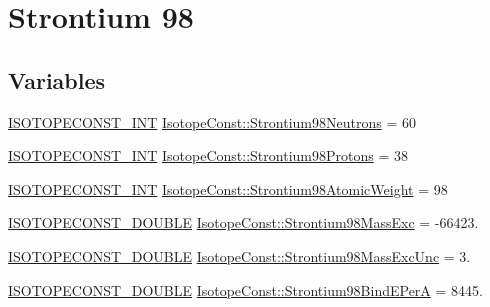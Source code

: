 \hypertarget{group___isotope_const-_strontium-_sr98}{}\section{Strontium 98}
\label{group___isotope_const-_strontium-_sr98}
\subsection*{Variables}
\begin{DoxyCompactItemize}
\item 
\mbox{\hyperlink{group___isotope_const-_macros_ga5f18360b3e99483a35c32d789e62621c}{I\+S\+O\+T\+O\+P\+E\+C\+O\+N\+S\+T\+\_\+\+I\+NT}} \mbox{\hyperlink{group___isotope_const-_strontium-_sr98_ga5e1e50013b9bf4f486841bad0eb68251}{Isotope\+Const\+::\+Strontium98\+Neutrons}} = 60
\item 
\mbox{\hyperlink{group___isotope_const-_macros_ga5f18360b3e99483a35c32d789e62621c}{I\+S\+O\+T\+O\+P\+E\+C\+O\+N\+S\+T\+\_\+\+I\+NT}} \mbox{\hyperlink{group___isotope_const-_strontium-_sr98_gaf0820f6f3fdb77f039a3033dd5ffedb0}{Isotope\+Const\+::\+Strontium98\+Protons}} = 38
\item 
\mbox{\hyperlink{group___isotope_const-_macros_ga5f18360b3e99483a35c32d789e62621c}{I\+S\+O\+T\+O\+P\+E\+C\+O\+N\+S\+T\+\_\+\+I\+NT}} \mbox{\hyperlink{group___isotope_const-_strontium-_sr98_ga8f81ac43878ab393e9ccc4210a23e144}{Isotope\+Const\+::\+Strontium98\+Atomic\+Weight}} = 98
\item 
\mbox{\hyperlink{group___isotope_const-_macros_ga8f45a7272ce02c0b4c65c44636ed719a}{I\+S\+O\+T\+O\+P\+E\+C\+O\+N\+S\+T\+\_\+\+D\+O\+U\+B\+LE}} \mbox{\hyperlink{group___isotope_const-_strontium-_sr98_ga87463b41b32ef5f2e0ef25a52d3527c4}{Isotope\+Const\+::\+Strontium98\+Mass\+Exc}} = -\/66423.
\item 
\mbox{\hyperlink{group___isotope_const-_macros_ga8f45a7272ce02c0b4c65c44636ed719a}{I\+S\+O\+T\+O\+P\+E\+C\+O\+N\+S\+T\+\_\+\+D\+O\+U\+B\+LE}} \mbox{\hyperlink{group___isotope_const-_strontium-_sr98_ga9dec3151c096e3b3cc4a9ab8df440959}{Isotope\+Const\+::\+Strontium98\+Mass\+Exc\+Unc}} = 3.
\item 
\mbox{\hyperlink{group___isotope_const-_macros_ga8f45a7272ce02c0b4c65c44636ed719a}{I\+S\+O\+T\+O\+P\+E\+C\+O\+N\+S\+T\+\_\+\+D\+O\+U\+B\+LE}} \mbox{\hyperlink{group___isotope_const-_strontium-_sr98_ga670ef2e40f9b6a9b1ff66027f3bd192c}{Isotope\+Const\+::\+Strontium98\+Bind\+E\+PerA}} = 8445.
\item 

\end{DoxyCompactItemize}
